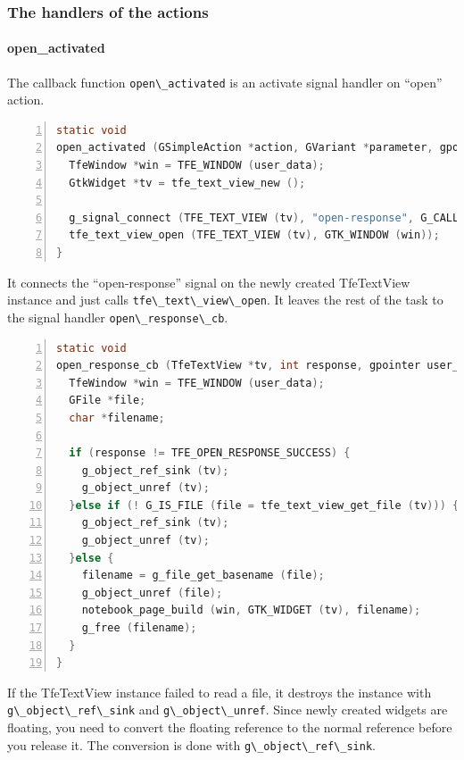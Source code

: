 \subsubsection{The handlers of the
actions}\label{the-handlers-of-the-actions}

\paragraph{open\_activated}\label{open_activated}

The callback function \passthrough{\lstinline!open\_activated!} is an
activate signal handler on ``open'' action.

\begin{lstlisting}[language=C, numbers=left]
static void
open_activated (GSimpleAction *action, GVariant *parameter, gpointer user_data) {
  TfeWindow *win = TFE_WINDOW (user_data);
  GtkWidget *tv = tfe_text_view_new ();

  g_signal_connect (TFE_TEXT_VIEW (tv), "open-response", G_CALLBACK (open_response_cb), win);
  tfe_text_view_open (TFE_TEXT_VIEW (tv), GTK_WINDOW (win));
}
\end{lstlisting}

It connects the ``open-response'' signal on the newly created
TfeTextView instance and just calls
\passthrough{\lstinline!tfe\_text\_view\_open!}. It leaves the rest of
the task to the signal handler
\passthrough{\lstinline!open\_response\_cb!}.

\begin{lstlisting}[language=C, numbers=left]
static void
open_response_cb (TfeTextView *tv, int response, gpointer user_data) {
  TfeWindow *win = TFE_WINDOW (user_data);
  GFile *file;
  char *filename;

  if (response != TFE_OPEN_RESPONSE_SUCCESS) {
    g_object_ref_sink (tv);
    g_object_unref (tv);
  }else if (! G_IS_FILE (file = tfe_text_view_get_file (tv))) {
    g_object_ref_sink (tv);
    g_object_unref (tv);
  }else {
    filename = g_file_get_basename (file);
    g_object_unref (file);
    notebook_page_build (win, GTK_WIDGET (tv), filename);
    g_free (filename);
  }
}
\end{lstlisting}

If the TfeTextView instance failed to read a file, it destroys the
instance with \passthrough{\lstinline!g\_object\_ref\_sink!} and
\passthrough{\lstinline!g\_object\_unref!}. Since newly created widgets
are floating, you need to convert the floating reference to the normal
reference before you release it. The conversion is done with
\passthrough{\lstinline!g\_object\_ref\_sink!}.

